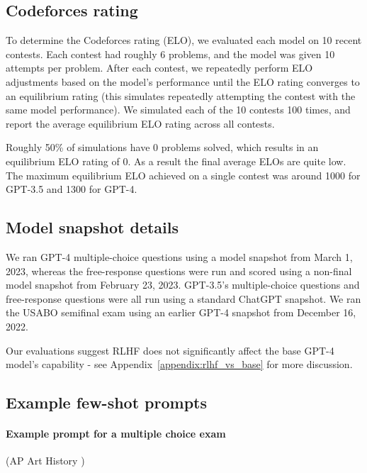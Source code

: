 \documentclass{article}
\begin{document}
\subsection{Codeforces rating}

To determine the Codeforces rating (ELO), we evaluated each model on 10 recent contests. Each contest had roughly 6 problems, and the model was given 10 attempts per problem. After each contest, we repeatedly perform ELO adjustments based on the model's performance until the ELO rating converges to an equilibrium rating (this simulates repeatedly attempting the contest with the same model performance). We simulated each of the 10 contests 100 times, and report the average equilibrium ELO rating across all contests.

Roughly 50\% of simulations have 0 problems solved, which results in an equilibrium ELO rating of 0. As a result the final average ELOs are quite low. The maximum equilibrium ELO achieved on a single contest was around 1000 for GPT-3.5 and 1300 for GPT-4. 

\subsection{Model snapshot details} 
We ran GPT-4 multiple-choice questions using a model snapshot from March 1, 2023, whereas the free-response questions were run and scored using a non-final model snapshot from February 23, 2023. GPT-3.5's multiple-choice questions and free-response questions were all run using a standard ChatGPT snapshot. We ran the USABO semifinal exam using an earlier GPT-4 snapshot from December 16, 2022.

Our evaluations suggest RLHF does not significantly affect the base GPT-4 model's capability - see Appendix~\ref{appendix:rlhf_vs_base} for more discussion.

\subsection{Example few-shot prompts}\label{sec:prompt_example}

\paragraph{Example prompt for a multiple choice exam} (AP Art History \cite{nici2020ap})
\end{document}
